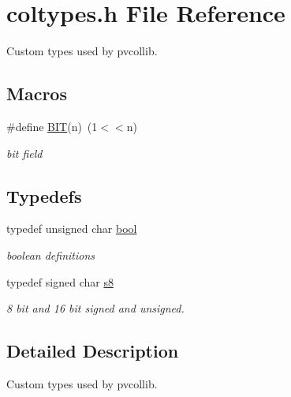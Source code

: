 \hypertarget{a00041}{}\section{coltypes.\+h File Reference}
\label{a00041}


Custom types used by pvcollib.  


\subsection*{Macros}
\begin{DoxyCompactItemize}
\item 
\mbox{\label{a00041_a3a8ea58898cb58fc96013383d39f482c}} 
\#define \hyperlink{a00041_a3a8ea58898cb58fc96013383d39f482c}{B\+IT}(n)~(1$<$$<$n)
\begin{DoxyCompactList}\small\item\em bit field \end{DoxyCompactList}\end{DoxyCompactItemize}
\subsection*{Typedefs}
\begin{DoxyCompactItemize}
\item 
\mbox{\label{a00041_a97a80ca1602ebf2303258971a2c938e2}} 
typedef unsigned char \hyperlink{a00041_a97a80ca1602ebf2303258971a2c938e2}{bool}
\begin{DoxyCompactList}\small\item\em boolean definitions \end{DoxyCompactList}\item 
\mbox{\label{a00041_a151f780fb455885061d3b77ec1c90c03}} 
typedef signed char \hyperlink{a00041_a151f780fb455885061d3b77ec1c90c03}{s8}
\begin{DoxyCompactList}\small\item\em 8 bit and 16 bit signed and unsigned. \end{DoxyCompactList}\end{DoxyCompactItemize}


\subsection{Detailed Description}
Custom types used by pvcollib. 

